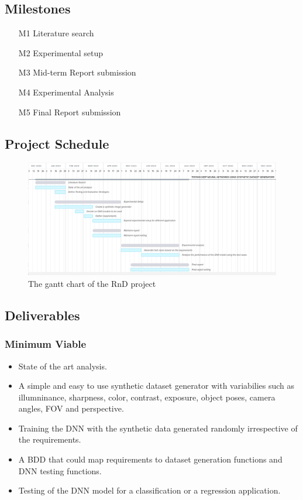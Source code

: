\documentclass[rnd]{mas_proposal}
\begin{document}
\begin{enumerate}
\end{enumerate}

\subsection{Milestones}
\begin{enumerate}
    \item[M1] Literature search
    \item[M2] Experimental setup
    \item[M3] Mid-term Report submission
    \item[M4] Experimental Analysis
    \item[M5] Final Report submission
\end{enumerate}

\subsection{Project Schedule}
    
\begin{figure}[h!]
    \centering
    \includegraphics[width=\textwidth]{images/gantt_Dec_15.png}
    \caption{The gantt chart of the RnD project}
    \label{fig:gantt_chart}
\end{figure}

\subsection{Deliverables}
\subsubsection*{Minimum Viable}

\begin{itemize}
    \item State of the art analysis.
    \item A simple and easy to use synthetic dataset generator with variabilies such as illumninance, sharpness, color, contrast, exposure, object poses, camera angles, FOV and perspective.
    \item Training the DNN with the synthetic data generated randomly irrespective of the requirements.
    \item A BDD that could map requirements to dataset generation functions and DNN testing functions.
    \item Testing of the DNN model for a classification or a regression application.
\end{itemize}
\end{document}
